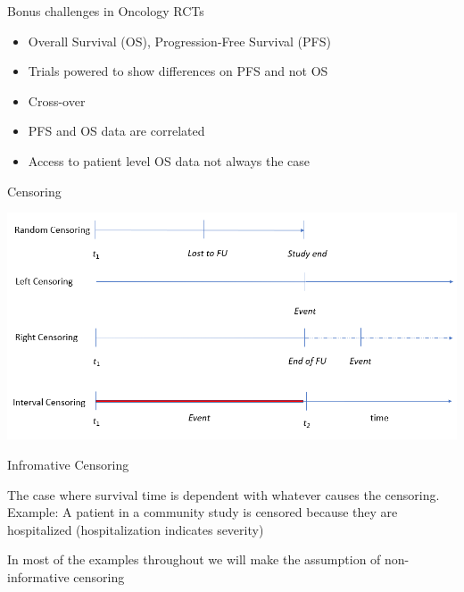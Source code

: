 \documentclass[
  ignorenonframetext,
]{beamer}
\providecommand{\tightlist}{%
  \setlength{\itemsep}{0pt}\setlength{\parskip}{0pt}}
\begin{document}
\begin{frame}{Bonus challenges in Oncology RCTs}
\protect\hypertarget{bonus-challenges-in-oncology-rcts}{}

\begin{itemize}
\tightlist
\item
  Overall Survival (OS), Progression-Free Survival (PFS)
\item
  Trials powered to show differences on PFS and not OS
\item
  Cross-over
\item
  PFS and OS data are correlated
\item
  Access to patient level OS data not always the case
\end{itemize}

\end{frame}

\begin{frame}{Censoring}
\protect\hypertarget{censoring}{}

\includegraphics[width=1\linewidth]{figures/censoring}

\end{frame}

\begin{frame}{Infromative Censoring}
\protect\hypertarget{infromative-censoring}{}

The case where survival time is dependent with whatever causes the
censoring. Example: A patient in a community study is censored because
they are hospitalized (hospitalization indicates severity)

In most of the examples throughout we will make the assumption of
non-informative censoring

\end{frame}
\end{document}
